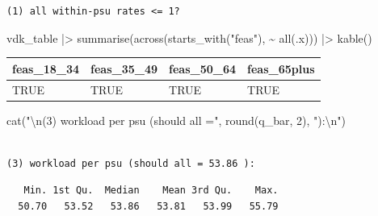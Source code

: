 \documentclass[
  11pt,
]{article}
\newenvironment{Shaded}{\begin{snugshade}}{\end{snugshade}}
\newcommand{\DecValTok}[1]{\textcolor[rgb]{0.68,0.00,0.00}{#1}}
\newcommand{\FunctionTok}[1]{\textcolor[rgb]{0.28,0.35,0.67}{#1}}
\newcommand{\NormalTok}[1]{\textcolor[rgb]{0.00,0.23,0.31}{#1}}
\newcommand{\SpecialCharTok}[1]{\textcolor[rgb]{0.37,0.37,0.37}{#1}}
\newcommand{\StringTok}[1]{\textcolor[rgb]{0.13,0.47,0.30}{#1}}
\begin{document}
\begin{verbatim}
(1) all within-psu rates <= 1?
\end{verbatim}

\begin{Shaded}
\begin{Highlighting}[]
\NormalTok{vdk\_table }\SpecialCharTok{|\textgreater{}} \FunctionTok{summarise}\NormalTok{(}\FunctionTok{across}\NormalTok{(}\FunctionTok{starts\_with}\NormalTok{(}\StringTok{"feas"}\NormalTok{), }\SpecialCharTok{\textasciitilde{}} \FunctionTok{all}\NormalTok{(.x))) }\SpecialCharTok{|\textgreater{}} \FunctionTok{kable}\NormalTok{()}
\end{Highlighting}
\end{Shaded}

\begin{longtable}[]{@{}llll@{}}
\toprule\noalign{}
feas\_18\_34 & feas\_35\_49 & feas\_50\_64 & feas\_65plus \\
\midrule\noalign{}
\endhead
\bottomrule\noalign{}
\endlastfoot
TRUE & TRUE & TRUE & TRUE \\
\end{longtable}

\begin{Shaded}
\begin{Highlighting}[]
\FunctionTok{cat}\NormalTok{(}\StringTok{"}\SpecialCharTok{\textbackslash{}n}\StringTok{(3) workload per psu (should all ="}\NormalTok{, }\FunctionTok{round}\NormalTok{(q\_bar, }\DecValTok{2}\NormalTok{), }\StringTok{"):}\SpecialCharTok{\textbackslash{}n}\StringTok{"}\NormalTok{)}
\end{Highlighting}
\end{Shaded}

\begin{verbatim}

(3) workload per psu (should all = 53.86 ):
\end{verbatim}

\begin{Shaded}
\end{Shaded}

\begin{verbatim}
   Min. 1st Qu.  Median    Mean 3rd Qu.    Max. 
  50.70   53.52   53.86   53.81   53.99   55.79 
\end{verbatim}
\end{document}
